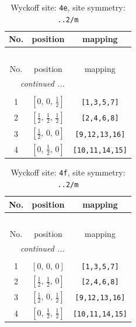 \documentclass[fleqn,8pt]{jsarticle}
\begin{document}
\renewcommand{\arraystretch}{1.2}
\begin{longtable}{ccc}
\caption{Wyckoff site: {\tt 4e}, site symmetry: {\tt ..2/m}}
 \\
 \hline \hline
No. & position & mapping \\ \hline \endfirsthead

\multicolumn{2}{l}{\tablename\ \thetable{}} \\
 \hline \hline
No. & position & mapping \\ \hline \endhead

 \hline \hline
\multicolumn{2}{r}{\footnotesize\it continued ...} \\ \endfoot

 \hline \hline
\multicolumn{2}{r}{} \\ \endlastfoot

1 & $\left[ 0,\, 0,\, \frac{1}{2} \right]$ & {\tt [1,3,5,7]} \\ \hline
2 & $\left[ \frac{1}{2},\, \frac{1}{2},\, \frac{1}{2} \right]$ & {\tt [2,4,6,8]} \\ \hline
3 & $\left[ \frac{1}{2},\, 0,\, 0 \right]$ & {\tt [9,12,13,16]} \\ \hline
4 & $\left[ 0,\, \frac{1}{2},\, 0 \right]$ & {\tt [10,11,14,15]} \\
\end{longtable}
\renewcommand{\arraystretch}{1.2}
\begin{longtable}{ccc}
\caption{Wyckoff site: {\tt 4f}, site symmetry: {\tt ..2/m}}
 \\
 \hline \hline
No. & position & mapping \\ \hline \endfirsthead

\multicolumn{2}{l}{\tablename\ \thetable{}} \\
 \hline \hline
No. & position & mapping \\ \hline \endhead

 \hline \hline
\multicolumn{2}{r}{\footnotesize\it continued ...} \\ \endfoot

 \hline \hline
\multicolumn{2}{r}{} \\ \endlastfoot

1 & $\left[ 0,\, 0,\, 0 \right]$ & {\tt [1,3,5,7]} \\ \hline
2 & $\left[ \frac{1}{2},\, \frac{1}{2},\, 0 \right]$ & {\tt [2,4,6,8]} \\ \hline
3 & $\left[ \frac{1}{2},\, 0,\, \frac{1}{2} \right]$ & {\tt [9,12,13,16]} \\ \hline
4 & $\left[ 0,\, \frac{1}{2},\, \frac{1}{2} \right]$ & {\tt [10,11,14,15]} \\
\end{longtable}
\end{document}
